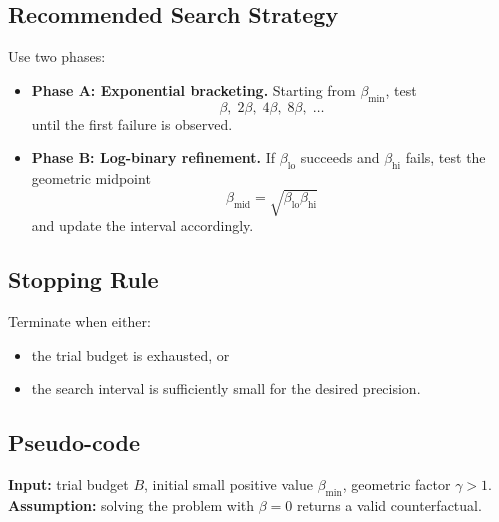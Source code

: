 \documentclass[11pt]{article}
\begin{document}
\subsection*{Recommended Search Strategy}
Use two phases:
\begin{itemize}
    \item \textbf{Phase A: Exponential bracketing.} Starting from $\beta_{\min}$, test
    \[
    \beta,\; 2\beta,\; 4\beta,\; 8\beta,\; \dots
    \]
    until the first failure is observed.
    \item \textbf{Phase B: Log-binary refinement.} If $\beta_{\mathrm{lo}}$ succeeds and $\beta_{\mathrm{hi}}$ fails, test the geometric midpoint
    \[
    \beta_{\mathrm{mid}} = \sqrt{\beta_{\mathrm{lo}}\beta_{\mathrm{hi}}}
    \]
    and update the interval accordingly.
\end{itemize}

\subsection*{Stopping Rule}
Terminate when either:
\begin{itemize}
    \item the trial budget is exhausted, or
    \item the search interval is sufficiently small for the desired precision.
\end{itemize}

\subsection*{Pseudo-code}
\noindent\textbf{Input:} trial budget $B$, initial small positive value $\beta_{\min}$, geometric factor $\gamma > 1$.\\
\textbf{Assumption:} solving the problem with $\beta=0$ returns a valid counterfactual.
\end{document}
